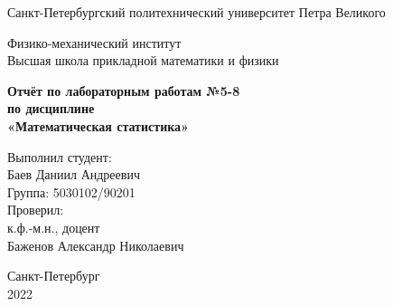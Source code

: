 \begin{titlepage}
	\newpage
	
	\begin{center}
		\textrm{\large Санкт-Петербургский политехнический университет \linebreak Петра Великого \\}
	\end{center}
	
	\begin{center}
		\textrm{\large Физико-механический институт \\ Высшая школа прикладной математики и физики \\}
	\end{center}

	\vspace{10em}
	
	\begin{center}
		\textrm{\textbf{\large Отчёт \linebreak по лабораторным работам №5-8 \\
				по дисциплине \\ «Математическая статистика»}}
	\end{center}
	
	\vspace{8em}
	
	\hfill\parbox{11cm}{
		\hspace*{4cm}Выполнил студент: \\
		\hspace*{4cm}Баев Даниил Андреевич \\
		\hspace*{4cm}Группа: 5030102/90201 \\
		\hspace*{4cm}Проверил: \\
		\hspace*{4cm}к.ф.-м.н., доцент \\
		\hspace*{4cm}Баженов Александр Николаевич \\
	}
	
	\vspace{\fill}
	
	\begin{center}
		Санкт-Петербург \\ 2022
	\end{center}
	
\end{titlepage}
